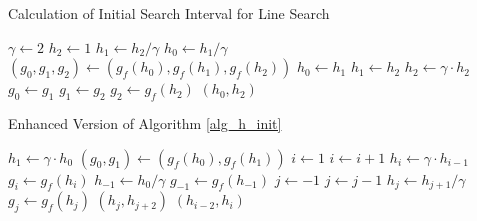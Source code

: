 \begin{algorithm}
\caption{Calculation of Initial Search Interval for Line Search}\label{alg_h_init}
\begin{algorithmic}[1]
\State $\gamma\gets 2$
\State $h_2\gets 1$
\State $h_1\gets h_2/\gamma$
\State $h_0\gets h_1/\gamma$
\State $(g_0,g_1,g_2)\gets (g_f(h_0),g_f(h_1),g_f(h_2))$
    \State $h_0\gets h_1$
    \State $h_1\gets h_2$
    \State $h_2\gets \gamma\cdot h_2$
    \State $g_0\gets g_1$
    \State $g_1\gets g_2$
    \State $g_2\gets g_f(h_2)$
\EndWhile
\State \Return $(h_0,h_2)$
\EndProcedure
\end{algorithmic}
\end{algorithm}
\begin{algorithm}
\caption{Enhanced Version of Algorithm \ref{alg_h_init}}\label{alg_h_init2}
\begin{algorithmic}[1]
\State $h_1\gets \gamma\cdot h_0$
\State $(g_0, g_1)\gets (g_f(h_0),g_f(h_1))$
\State $i\gets 1$
    \State $i\gets i+1$
    \State $h_i\gets \gamma\cdot h_{i-1}$
    \State $g_i\gets g_f(h_i)$
\EndWhile
{}
    \State $h_{-1}\gets h_0/\gamma$
    \State $g_{-1}\gets g_f(h_{-1})$
    \State $j\gets -1$
        \State $j\gets j-1$
        \State $h_j\gets h_{j+1}/\gamma$
        \State $g_j\gets g_f(h_j)$
    \EndWhile
    \State \Return $(h_j,h_{j+2})$
\Else
    \State \Return $(h_{i-2},h_i)$
\EndIf
\EndProcedure
\end{algorithmic}
\end{algorithm}


